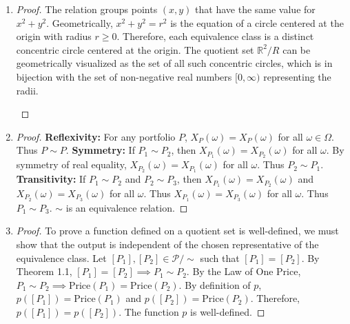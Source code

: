 \documentclass[11pt, a4paper]{article}
\theoremstyle{definition}
\theoremstyle{remark}
\newcommand{\R}{\mathbb{R}}
\begin{document}
\begin{enumerate}[label=\textbf{\arabic*.}, leftmargin=*]
    \item \begin{proof}
    The relation groups points $(x, y)$ that have the same value for $x^2 + y^2$. Geometrically, $x^2 + y^2 = r^2$ is the equation of a circle centered at the origin with radius $r \ge 0$.
    Therefore, each equivalence class is a distinct concentric circle centered at the origin. The quotient set $\R^2/R$ can be geometrically visualized as the set of all such concentric circles, which is in bijection with the set of non-negative real numbers $[0, \infty)$ representing the radii.
    
    \begin{center}
    \end{center}
    \end{proof}

    \item \begin{proof}
    \textbf{Reflexivity:} For any portfolio $P$, $X_P(\omega) = X_P(\omega)$ for all $\omega \in \Omega$. Thus $P \sim P$.
    \textbf{Symmetry:} If $P_1 \sim P_2$, then $X_{P_1}(\omega) = X_{P_2}(\omega)$ for all $\omega$. By symmetry of real equality, $X_{P_2}(\omega) = X_{P_1}(\omega)$ for all $\omega$. Thus $P_2 \sim P_1$.
    \textbf{Transitivity:} If $P_1 \sim P_2$ and $P_2 \sim P_3$, then $X_{P_1}(\omega) = X_{P_2}(\omega)$ and $X_{P_2}(\omega) = X_{P_3}(\omega)$ for all $\omega$. Thus $X_{P_1}(\omega) = X_{P_3}(\omega)$ for all $\omega$. Thus $P_1 \sim P_3$. $\sim$ is an equivalence relation.
    \end{proof}

    \item \begin{proof}
    To prove a function defined on a quotient set is well-defined, we must show that the output is independent of the chosen representative of the equivalence class.
    Let $[P_1], [P_2] \in \mathcal{P}/\sim$ such that $[P_1] = [P_2]$.
    By Theorem 1.1, $[P_1] = [P_2] \implies P_1 \sim P_2$.
    By the Law of One Price, $P_1 \sim P_2 \implies \text{Price}(P_1) = \text{Price}(P_2)$.
    By definition of $p$, $p([P_1]) = \text{Price}(P_1)$ and $p([P_2]) = \text{Price}(P_2)$.
    Therefore, $p([P_1]) = p([P_2])$. The function $p$ is well-defined.
    \end{proof}


\end{enumerate}
\end{document}
